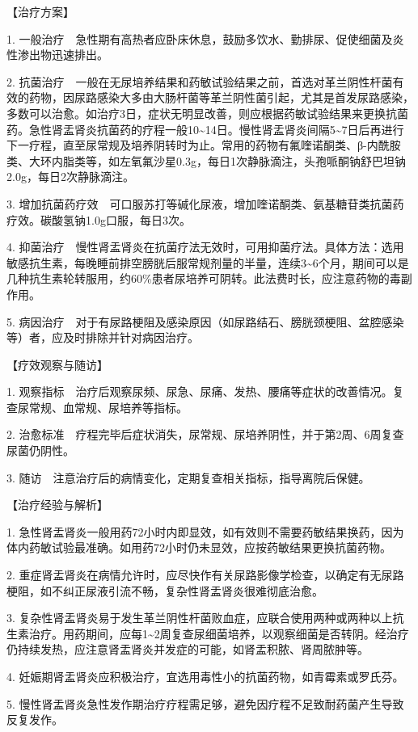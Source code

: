 【治疗方案】

1.
一般治疗　急性期有高热者应卧床休息，鼓励多饮水、勤排尿、促使细菌及炎性渗出物迅速排出。

2.
抗菌治疗　一般在无尿培养结果和药敏试验结果之前，首选对革兰阴性杆菌有效的药物，因尿路感染大多由大肠杆菌等革兰阴性菌引起，尤其是首发尿路感染，多数可以治愈。如治疗3日，症状无明显改善，则应根据药敏试验结果来更换抗菌药。急性肾盂肾炎抗菌药的疗程一般10\textasciitilde{}14日。慢性肾盂肾炎间隔5\textasciitilde{}7日后再进行下一疗程，直至尿常规及培养阴转时为止。常用的药物有氟喹诺酮类、β-内酰胺类、大环内脂类等，如左氧氟沙星0.3g，每日1次静脉滴注，头孢哌酮钠舒巴坦钠2.0g，每日2次静脉滴注。

3.
增加抗菌药疗效　可口服苏打等碱化尿液，增加喹诺酮类、氨基糖苷类抗菌药疗效。碳酸氢钠1.0g口服，每日3次。

4.
抑菌治疗　慢性肾盂肾炎在抗菌疗法无效时，可用抑菌疗法。具体方法：选用敏感抗生素，每晚睡前排空膀胱后服常规剂量的半量，连续3\textasciitilde{}6个月，期间可以是几种抗生素轮转服用，约60\%患者尿培养可阴转。此法费时长，应注意药物的毒副作用。

5.
病因治疗　对于有尿路梗阻及感染原因（如尿路结石、膀胱颈梗阻、盆腔感染等）者，应及时排除并针对病因治疗。

【疗效观察与随访】

1.
观察指标　治疗后观察尿频、尿急、尿痛、发热、腰痛等症状的改善情况。复查尿常规、血常规、尿培养等指标。

2.
治愈标准　疗程完毕后症状消失，尿常规、尿培养阴性，并于第2周、6周复查尿菌仍阴性。

3. 随访　注意治疗后的病情变化，定期复查相关指标，指导离院后保健。

【治疗经验与解析】

1.
急性肾盂肾炎一般用药72小时内即显效，如有效则不需要药敏结果换药，因为体内药敏试验最准确。如用药72小时仍未显效，应按药敏结果更换抗菌药物。

2.
重症肾盂肾炎在病情允许时，应尽快作有关尿路影像学检查，以确定有无尿路梗阻，如不纠正尿液引流不畅，复杂性肾盂肾炎很难彻底治愈。

3.
复杂性肾盂肾炎易于发生革兰阴性杆菌败血症，应联合使用两种或两种以上抗生素治疗。用药期间，应每1\textasciitilde{}2周复查尿细菌培养，以观察细菌是否转阴。经治疗仍持续发热，应注意肾盂肾炎并发症的可能，如肾盂积脓、肾周脓肿等。

4. 妊娠期肾盂肾炎应积极治疗，宜选用毒性小的抗菌药物，如青霉素或罗氏芬。

5.
慢性肾盂肾炎急性发作期治疗疗程需足够，避免因疗程不足致耐药菌产生导致反复发作。

